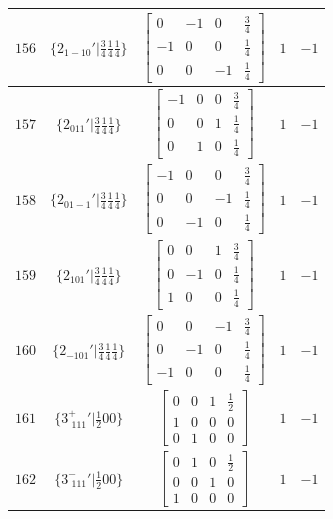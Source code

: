 \documentclass[fleqn,8pt]{jsarticle}
\begin{document}
\begin{longtable}{ccccc}
$ 156 $ & $ \{2{}_{1-10}{}'|\frac{3}{4} \frac{1}{4} \frac{1}{4}\} $ & $ \begin{bmatrix} 0 & -1 & 0 & \frac{3}{4} \\ -1 & 0 & 0 & \frac{1}{4} \\ 0 & 0 & -1 & \frac{1}{4} \end{bmatrix} $ & $ 1 $ & $ -1 $ \\ \hline
$ 157 $ & $ \{2{}_{011}{}'|\frac{3}{4} \frac{1}{4} \frac{1}{4}\} $ & $ \begin{bmatrix} -1 & 0 & 0 & \frac{3}{4} \\ 0 & 0 & 1 & \frac{1}{4} \\ 0 & 1 & 0 & \frac{1}{4} \end{bmatrix} $ & $ 1 $ & $ -1 $ \\ \hline
$ 158 $ & $ \{2{}_{01-1}{}'|\frac{3}{4} \frac{1}{4} \frac{1}{4}\} $ & $ \begin{bmatrix} -1 & 0 & 0 & \frac{3}{4} \\ 0 & 0 & -1 & \frac{1}{4} \\ 0 & -1 & 0 & \frac{1}{4} \end{bmatrix} $ & $ 1 $ & $ -1 $ \\ \hline
$ 159 $ & $ \{2{}_{101}{}'|\frac{3}{4} \frac{1}{4} \frac{1}{4}\} $ & $ \begin{bmatrix} 0 & 0 & 1 & \frac{3}{4} \\ 0 & -1 & 0 & \frac{1}{4} \\ 1 & 0 & 0 & \frac{1}{4} \end{bmatrix} $ & $ 1 $ & $ -1 $ \\ \hline
$ 160 $ & $ \{2{}_{-101}{}'|\frac{3}{4} \frac{1}{4} \frac{1}{4}\} $ & $ \begin{bmatrix} 0 & 0 & -1 & \frac{3}{4} \\ 0 & -1 & 0 & \frac{1}{4} \\ -1 & 0 & 0 & \frac{1}{4} \end{bmatrix} $ & $ 1 $ & $ -1 $ \\ \hline
$ 161 $ & $ \{3^{+}_{\,\,111}{}'|\frac{1}{2} 0 0\} $ & $ \begin{bmatrix} 0 & 0 & 1 & \frac{1}{2} \\ 1 & 0 & 0 & 0 \\ 0 & 1 & 0 & 0 \end{bmatrix} $ & $ 1 $ & $ -1 $ \\ \hline
$ 162 $ & $ \{3^{-}_{\,\,111}{}'|\frac{1}{2} 0 0\} $ & $ \begin{bmatrix} 0 & 1 & 0 & \frac{1}{2} \\ 0 & 0 & 1 & 0 \\ 1 & 0 & 0 & 0 \end{bmatrix} $ & $ 1 $ & $ -1 $ \\ \hline

\end{longtable}
\end{document}
